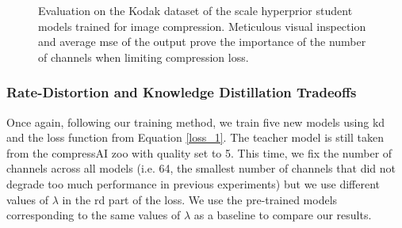 \documentclass{article}
\begin{document}
\begin{figure}[H]
    \centering
    \qquad
    \caption[Evaluation on the Kodak dataset of the scale hyperprior student models trained for image compression.]{Evaluation on the Kodak dataset of the scale hyperprior student models trained for image compression. Meticulous visual inspection and average \acrshort{mse} of the output prove the importance of the number of channels when limiting compression loss.}
    \label{kd_lic_2}
\end{figure}

\subsubsection{Rate-Distortion and Knowledge Distillation Tradeoffs}
Once again, following our training method, we train five new models using \acrshort{kd} and the loss function from Equation \ref{loss_1}. The teacher model is still taken from the compressAI zoo with \textsf{quality} set to 5. This time, we fix the number of channels across all models (i.e. 64, the smallest number of channels that did not degrade too much performance in previous experiments) but we use different values of \(\lambda\) in the \acrshort{rd} part of the loss. We use the pre-trained models corresponding to the same values of \(\lambda\) as a baseline to compare our results.
\end{document}

